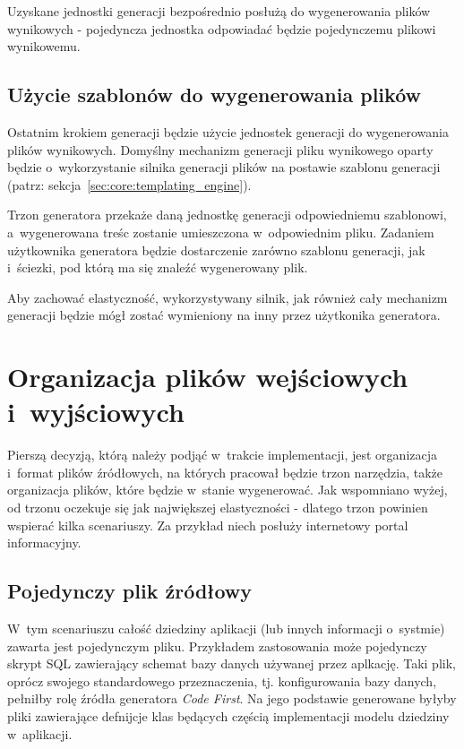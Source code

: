 Uzyskane jednostki generacji bezpośrednio posłużą do wygenerowania plików wynikowych - pojedyncza jednostka odpowiadać będzie pojedynczemu plikowi wynikowemu.


\subsection{Użycie szablonów do wygenerowania plików}

Ostatnim krokiem generacji będzie użycie jednostek generacji do wygenerowania plików wynikowych.
Domyślny mechanizm generacji pliku wynikowego oparty będzie o~wykorzystanie silnika generacji plików na postawie szablonu generacji (patrz: sekcja~\ref{sec:core:templating_engine}).

Trzon generatora przekaże daną jednostkę generacji odpowiedniemu szablonowi, a~wygenerowana treśc zostanie umieszczona w~odpowiednim pliku.
Zadaniem użytkownika generatora będzie dostarczenie zarówno szablonu generacji, jak i~ściezki, pod którą ma się znaleźć wygenerowany plik.

Aby zachować elastyczność, wykorzystywany silnik, jak również cały mechanizm generacji będzie mógł zostać wymieniony na inny przez użytkonika generatora.



\section{Organizacja plików wejściowych i~wyjściowych} \label{sec:core:files_structure}

Pierszą decyzją, którą należy podjąć w~trakcie implementacji, jest organizacja i~format plików źródłowych, na których pracował będzie trzon narzędzia, także organizacja plików, które będzie w~stanie wygenerować.
Jak wspomniano wyżej, od trzonu oczekuje się jak największej elastyczności - dlatego trzon powinien wspierać kilka scenariuszy.
Za przykład niech posłuży internetowy portal informacyjny.


\subsection{Pojedynczy plik źródłowy}

W~tym scenariuszu całość dziedziny aplikacji (lub innych informacji o~systmie) zawarta jest pojedynczym pliku.
Przykładem zastosowania może pojedynczy skrypt SQL zawierający schemat bazy danych używanej przez aplkację.
Taki plik, oprócz swojego standardowego przeznaczenia, tj. konfigurowania bazy danych, pełniłby rolę źródła generatora \emph{Code First}.
Na jego podstawie generowane byłyby pliki zawierające defnijcje klas będących częścią implementacji modelu dziedziny w~aplikacji.

